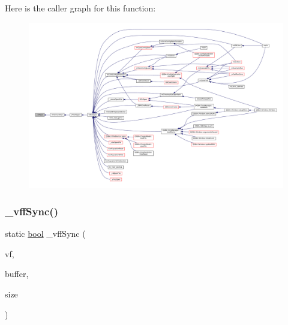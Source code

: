 Here is the caller graph for this function\+:
\nopagebreak
\begin{figure}[H]
\begin{center}
\leavevmode
\includegraphics[width=350pt]{vfs-file_8c_af0919c50f70e8df2e12ca7fb437a0b4b_icgraph}
\end{center}
\end{figure}
\mbox{\label{vfs-file_8c_ad31804a57b1b09d56fcefadca87ba2d1}} 
\subsubsection{\texorpdfstring{\+\_\+vff\+Sync()}{\_vffSync()}}
{\footnotesize\ttfamily static \mbox{\hyperlink{libretro_8h_a4a26dcae73fb7e1528214a068aca317e}{bool}} \+\_\+vff\+Sync (\begin{DoxyParamCaption}\item[{struct V\+File $\ast$}]{vf,  }\item[{const void $\ast$}]{buffer,  }\item[{size\+\_\+t}]{size }\end{DoxyParamCaption})\hspace{0.3cm}{\ttfamily [static]}}

